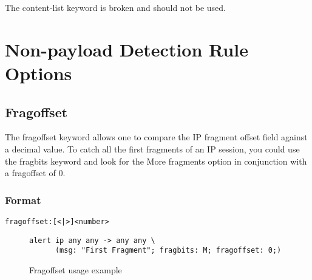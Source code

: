 \documentclass[english]{report}
\begin{document}
The content-list keyword is broken and should not be used.

%
%
%
%


\section{Non-payload Detection Rule Options}
\subsection{Fragoffset \label{fragoffset section}}

The fragoffset keyword allows one to compare the IP fragment offset
field against a decimal value. To catch all the first fragments of
an IP session, you could use the fragbits keyword and look for the
More fragments option in conjunction with a fragoffset of 0.


\subsubsection{Format}

\begin{verbatim}
fragoffset:[<|>]<number>
\end{verbatim}

\begin{figure}[!hbpt]
\begin{verbatim}
alert ip any any -> any any \
      (msg: "First Fragment"; fragbits: M; fragoffset: 0;)
\end{verbatim}
\caption{Fragoffset usage example \label{fragoffset usage example}}
\end{figure}
\end{document}
